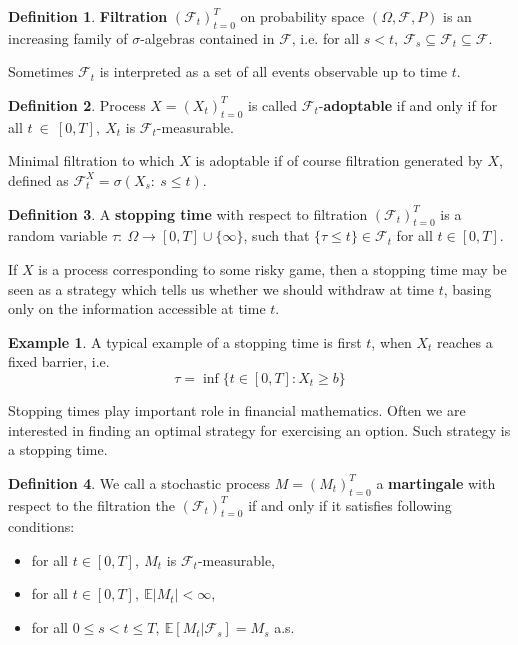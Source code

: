 \documentclass[a4paper,12pt, oneside]{book}
\theoremstyle{definition}
\newtheorem{mydef}{Definition}[chapter]
\newtheorem{example}{Example}[chapter]
\theoremstyle{remark}
\def\E{{\mathbb{E}}}
\begin{document}
\begin{mydef}
 \textbf{Filtration} $(\mathcal{F}_t)_{t=0}^T$ on probability space $(\Omega, \mathcal{F}, {P})$ is an increasing family of $\sigma$-algebras contained in $\mathcal{F}$, i.e. for all $s<t,\ \mathcal{F}_s \subseteq \mathcal{F}_t \subseteq \mathcal{F}$.
\end{mydef}
\noindent Sometimes $\mathcal{F}_t$ is interpreted as a set of all events observable up to time $t$.

\begin{mydef}
 Process $X=(X_t)_{t=0}^T$ is called $\mathcal{F}_t$-\textbf{adoptable} if and only if for all $t~\in~[0,T],\ X_t$ is $\mathcal{F}_t$-measurable.
\end{mydef}
\noindent Minimal filtration to which $X$ is adoptable if of course filtration generated by $X$, defined as $\mathcal{F}_t^X = \sigma(X_s:\ s \leq t)$.

\begin{mydef}
 A \textbf{stopping time} with respect to filtration $(\mathcal{F}_t)_{t=0}^T$ is a random variable $\tau:\ \Omega \rightarrow [0,T]\cup\{\infty\}$, such that $\{\tau \leq t\} \in \mathcal{F}_t$ for all $t \in [0,T]$.
\end{mydef}
If $X$ is a process corresponding to some risky game, then a stopping time may be seen as a strategy which tells us whether we should withdraw at time $t$, basing only on the information accessible at time $t$.
\begin{example}
 A typical example of a stopping time is first $t$, when $X_t$ reaches a fixed barrier, i.e.
 \[\tau = \inf\{t\in[0,T]: X_t \geq b\}\]
\end{example}
\noindent Stopping times play important role in financial mathematics. Often we are interested in finding an optimal strategy for exercising an option. Such strategy is a stopping time.

\begin{mydef}
 We call a stochastic process $M=(M_t)_{t=0}^T$ a \textbf{martingale} with respect to the filtration the $(\mathcal{F}_t)_{t=0}^T$ if and only if it satisfies following conditions:
 \begin{itemize}
  \item for all $t \in [0,T],\ M_t$ is $\mathcal{F}_t$-measurable,
  \item for all $t \in [0,T],\ \E|M_t| < \infty$,
  \item for all $0 \leq s < t \leq T,\ \E[M_t|\mathcal{F}_s] = M_s$  a.s.
 \end{itemize}
\end{mydef}
\end{document}
